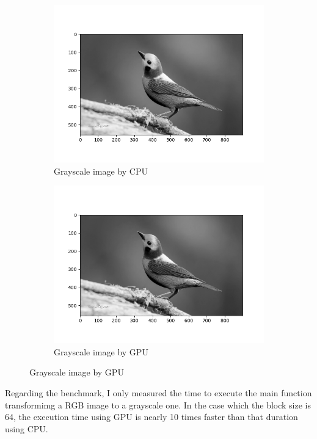 \documentclass{article}
\begin{document}
\begin{figure}[H]
\centering
\begin{subfigure}{.5\textwidth}
  \centering
  \includegraphics[scale=0.45]{images/lw3manual.png}
  \caption{Grayscale image by CPU}
  \label{fig:sub1}
\end{subfigure}%
\begin{subfigure}{.5\textwidth}
  \centering
  \includegraphics[scale=0.45]{images/lw3cuda.png}
  \caption{Grayscale image by GPU}
  \label{fig:sub2}
\end{subfigure}
\label{fig:test}
\end{figure}

Regarding the benchmark, I only measured the time to execute the main function transformimg a RGB image to a grayscale one. In the case which the block size is 64, the execution time using GPU is nearly 10 times faster than that duration using CPU.
\end{document}

